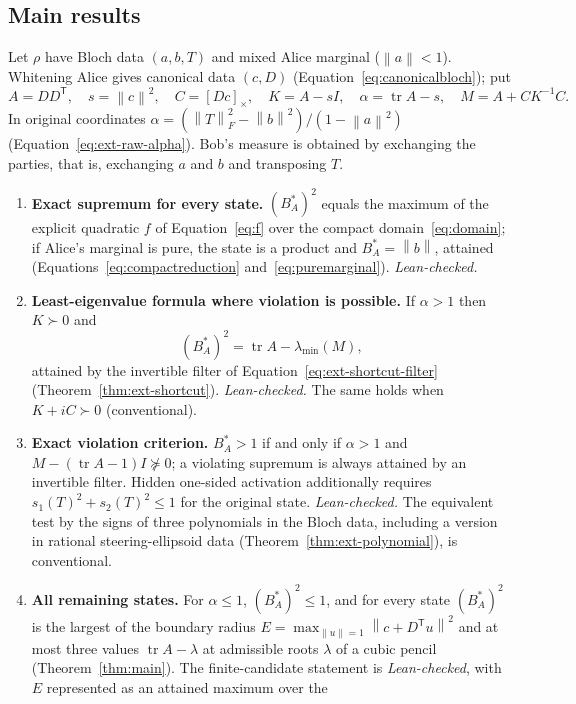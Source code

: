 \documentclass[11pt,a4paper]{article}
\theoremstyle{remark}\newtheorem{remark}[theorem]{Remark}
\DeclareMathOperator{\tr}{tr}\DeclareMathOperator{\spec}{spec}
\newcommand{\norm}[1]{\left\lVert#1\right\rVert}
\begin{document}
\subsection{Main results}
\label{sec:main-results}

Let $\rho$ have Bloch data $(a,b,T)$ and mixed Alice marginal
($\norm a<1$). Whitening Alice gives canonical data $(c,D)$
(Equation~\eqref{eq:canonicalbloch}); put
\[
 A=DD^{\mathsf T},\quad s=\norm c^2,\quad C=[Dc]_\times,\quad K=A-sI,\quad
 \alpha=\tr A-s,\quad M=A+CK^{-1}C.
\]
In original coordinates $\alpha=(\norm T_F^2-\norm b^2)/(1-\norm a^2)$
(Equation~\eqref{eq:ext-raw-alpha}). Bob's measure is obtained by exchanging
the parties, that is, exchanging $a$ and $b$ and transposing $T$.

\begin{enumerate}[label=\textbf{\Alph*.},leftmargin=2em]
\item \textbf{Exact supremum for every state.} $(B_A^*)^2$ equals the
maximum of the explicit quadratic $f$ of Equation~\eqref{eq:f} over the
compact domain~\eqref{eq:domain}; if Alice's marginal is pure, the state
is a product and $B_A^*=\norm b$, attained
(Equations~\eqref{eq:compactreduction} and~\eqref{eq:puremarginal}).
\emph{Lean-checked.}
\item \textbf{Least-eigenvalue formula where violation is possible.}
If $\alpha>1$ then $K\succ0$ and
\[
 (B_A^*)^2=\tr A-\lambda_{\min}(M),
\]
attained by the invertible filter of Equation~\eqref{eq:ext-shortcut-filter}
(Theorem~\ref{thm:ext-shortcut}). \emph{Lean-checked.} The same holds when
$K+iC\succ0$ (conventional).
\item \textbf{Exact violation criterion.} $B_A^*>1$ if and only if
$\alpha>1$ and $M-(\tr A-1)I\not\succeq0$; a violating supremum is always
attained by an invertible filter. Hidden one-sided activation additionally
requires $s_1(T)^2+s_2(T)^2\le1$ for the original state. \emph{Lean-checked.}
The equivalent test by the signs of three polynomials in the Bloch data,
including a version in rational steering-ellipsoid data
(Theorem~\ref{thm:ext-polynomial}), is conventional.
\item \textbf{All remaining states.} For $\alpha\le1$, $(B_A^*)^2\le1$, and
for every state $(B_A^*)^2$ is the largest of the boundary radius
$E=\max_{\norm u=1}\norm{c+D^{\mathsf T}u}^2$ and at most three values
$\tr A-\lambda$ at admissible roots $\lambda$ of a cubic pencil
(Theorem~\ref{thm:main}). The finite-candidate statement is
\emph{Lean-checked}, with $E$ represented as an attained maximum over the

\end{enumerate}
\end{document}
